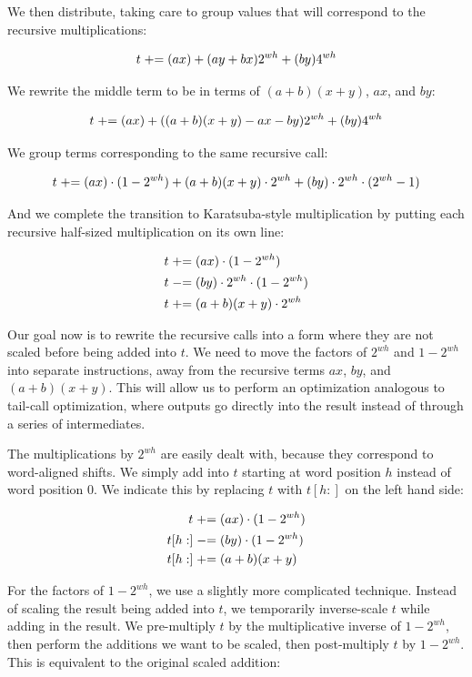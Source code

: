 \documentclass[onecolumn,unpublished]{quantumarticle}
\begin{document}
We then distribute, taking care to group values that will correspond to the recursive multiplications:

$$t \mathrel{+}= (ax) + (ay + bx) 2^{wh} + (by)4^{wh}$$

We rewrite the middle term to be in terms of $(a+b)(x + y)$, $ax$, and $by$:

$$t \mathrel{+}= (ax) + ((a+b)(x + y) - ax - by) 2^{wh} + (by)4^{wh}$$

We group terms corresponding to the same recursive call:

$$t \mathrel{+}= (ax) \cdot (1 - 2^{wh}) + (a+b)(x + y) \cdot 2^{wh} + (by) \cdot 2^{wh} \cdot (2^{wh}-1)$$

And we complete the transition to Karatsuba-style multiplication by putting each recursive half-sized multiplication on its own line:

$$\begin{aligned}
t &\mathrel{+}= (ax) \cdot (1 - 2^{wh})
\\
t &\mathrel{-}= (by) \cdot 2^{wh} \cdot (1-2^{wh})
\\
t &\mathrel{+}= (a+b)(x + y) \cdot 2^{wh}
\end{aligned}$$

Our goal now is to rewrite the recursive calls into a form where they are not scaled before being added into $t$.
We need to move the factors of $2^{wh}$ and $1-2^{wh}$ into separate instructions, away from the recursive terms $ax$, $by$, and $(a+b)(x+y)$.
This will allow us to perform an optimization analogous to tail-call optimization, where outputs go directly into the result instead of through a series of intermediates.

The multiplications by $2^{wh}$ are easily dealt with, because they correspond to word-aligned shifts.
We simply add into $t$ starting at word position $h$ instead of word position 0.
We indicate this by replacing $t$ with $t[h:]$ on the left hand side:

$$\begin{aligned}
t &\mathrel{+}= (ax) \cdot (1 - 2^{wh})
\\
t[h:] &\mathrel{-}= (by) \cdot (1 - 2^{wh})
\\
t[h:] &\mathrel{+}= (a+b)(x + y)
\end{aligned}$$

For the factors of $1-2^{wh}$, we use a slightly more complicated technique.
Instead of scaling the result being added into $t$, we temporarily inverse-scale $t$ while adding in the result.
We pre-multiply $t$ by the multiplicative inverse of $1 - 2^{wh}$, then perform the additions we want to be scaled, then post-multiply $t$ by $1 - 2^{wh}$.
This is equivalent to the original scaled addition:
\end{document}
